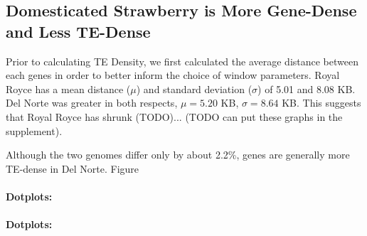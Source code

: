 \documentclass[fleqn,10pt]{olplainarticle}
\begin{document}
\subsection{Domesticated Strawberry is More Gene-Dense and Less TE-Dense}
Prior to calculating TE Density, we first calculated the average distance between each genes in order to better inform the choice of window parameters.
Royal Royce has a mean distance ($\mu$) and standard deviation ($\sigma$) of 5.01 and 8.08 KB.
Del Norte was greater in both respects,  $\mu = 5.20$ KB, $\sigma = 8.64$ KB.
This suggests that Royal Royce has shrunk (TODO)...
(TODO can put these graphs in the supplement).

Although the two genomes differ only by about 2.2\%, genes are generally more TE-dense in Del Norte.
Figure 


\paragraph{Dotplots:}
\paragraph{Dotplots:}

\end{document}
